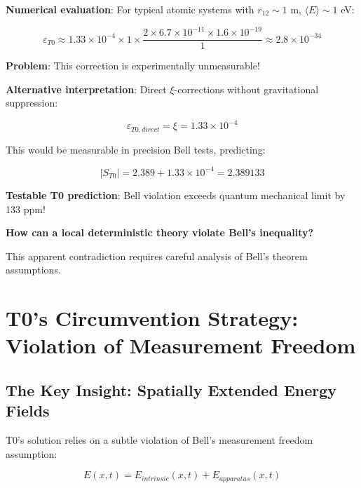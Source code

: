 \documentclass[12pt,a4paper]{article}
\newcommand{\Efield}{E}
\newcommand{\xipar}{\xi}
\begin{document}
	\textbf{Numerical evaluation}: For typical atomic systems with $r_{12} \sim 1$ m, $\langle E \rangle \sim 1$ eV:
	
	\begin{equation}
		\varepsilon_{T0} \approx 1.33 \times 10^{-4} \times 1 \times \frac{2 \times 6.7 \times 10^{-11} \times 1.6 \times 10^{-19}}{1} \approx 2.8 \times 10^{-34}
	\end{equation}
	
	\textbf{Problem}: This correction is experimentally unmeasurable!
	
	\textbf{Alternative interpretation}: Direct $\xipar$-corrections without gravitational suppression:
	
	\begin{equation}
		\varepsilon_{T0,direct} = \xipar = 1.33 \times 10^{-4}
	\end{equation}
	
	This would be measurable in precision Bell tests, predicting:
	
	\begin{equation}
		|S_{T0}| = 2.389 + 1.33 \times 10^{-4} = 2.389133
	\end{equation}
	
	\textbf{Testable T0 prediction}: Bell violation exceeds quantum mechanical limit by 133 ppm!
	
	\begin{tcolorbox}[colback=yellow!5!white,colframe=orange!75!black,title=Critical Question]
		\textbf{How can a local deterministic theory violate Bell's inequality?}
		
		This apparent contradiction requires careful analysis of Bell's theorem assumptions.
	\end{tcolorbox}
	
	\section{T0's Circumvention Strategy: Violation of Measurement Freedom}
	
	\subsection{The Key Insight: Spatially Extended Energy Fields}
	
	T0's solution relies on a subtle violation of Bell's measurement freedom assumption:
	
	\begin{equation}
		\Efield(x,t) = \Efield_{intrinsic}(x,t) + \Efield_{apparatus}(x,t)
	\end{equation}
	
\end{document}
